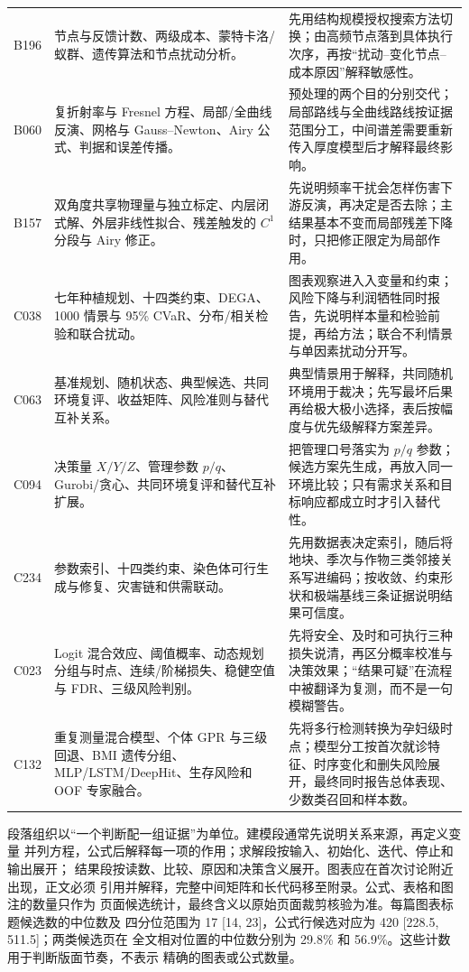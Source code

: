 \begin{longtable}{p{1.4cm}p{5.2cm}p{7.0cm}}
B196 & 节点与反馈计数、两级成本、蒙特卡洛/蚁群、遗传算法和节点扰动分析。 &
先用结构规模授权搜索方法切换；由高频节点落到具体执行次序，再按“扰动--变化节点--成本原因”解释敏感性。\\
B060 & 复折射率与 Fresnel 方程、局部/全曲线反演、网格与 Gauss--Newton、Airy 公式、判据和误差传播。 &
预处理的两个目的分别交代；局部路线与全曲线路线按证据范围分工，中间谱差需要重新传入厚度模型后才解释最终影响。\\
B157 & 双角度共享物理量与独立标定、内层闭式解、外层非线性拟合、残差触发的 $C^1$ 分段与 Airy 修正。 &
先说明频率干扰会怎样伤害下游反演，再决定是否去除；主结果基本不变而局部残差下降时，只把修正限定为局部作用。\\
C038 & 七年种植规划、十四类约束、DEGA、1000 情景与 95\% CVaR、分布/相关检验和联合扰动。 &
图表观察进入入变量和约束；风险下降与利润牺牲同时报告，先说明样本量和检验前提，再给方法；联合不利情景与单因素扰动分开写。\\
C063 & 基准规划、随机状态、典型候选、共同环境复评、收益矩阵、风险准则与替代互补关系。 &
典型情景用于解释，共同随机环境用于裁决；先写最坏后果再给极大极小选择，表后按幅度与优先级解释方案差异。\\
C094 & 决策量 $X/Y/Z$、管理参数 $p/q$、Gurobi/贪心、共同环境复评和替代互补扩展。 &
把管理口号落实为 $p/q$ 参数；候选方案先生成，再放入同一环境比较；只有需求关系和目标响应都成立时才引入替代性。\\
C234 & 参数索引、十四类约束、染色体可行生成与修复、灾害链和供需联动。 &
先用数据表决定索引，随后将地块、季次与作物三类邻接关系写进编码；按收敛、约束形状和极端基线三条证据说明结果可信度。\\
C023 & Logit 混合效应、阈值概率、动态规划分组与时点、连续/阶梯损失、稳健空值与 FDR、三级风险判别。 &
先将安全、及时和可执行三种损失说清，再区分概率校准与决策效果；“结果可疑”在流程中被翻译为复测，而不是一句模糊警告。\\
C132 & 重复测量混合模型、个体 GPR 与三级回退、BMI 遗传分组、MLP/LSTM/DeepHit、生存风险和 OOF 专家融合。 &
先将多行检测转换为孕妇级时点；模型分工按首次就诊特征、时序变化和删失风险展开，最终同时报告总体表现、少数类召回和样本数。\\
\bottomrule
\end{longtable}

段落组织以“一个判断配一组证据”为单位。建模段通常先说明关系来源，再定义变量
并列方程，公式后解释每一项的作用；求解段按输入、初始化、迭代、停止和输出展开；
结果段按读数、比较、原因和决策含义展开。图表应在首次讨论附近出现，正文必须
引用并解释，完整中间矩阵和长代码移至附录。公式、表格和图注的数量只作为
页面候选统计，最终含义以原始页面裁剪核验为准。每篇图表标题候选数的中位数及
四分位范围为 17 [14, 23]，公式行候选对应为 420 [228.5, 511.5]；两类候选页在
全文相对位置的中位数分别为 29.8\% 和 56.9\%。这些计数用于判断版面节奏，不表示
精确的图表或公式数量。

